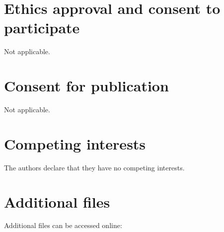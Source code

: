 \section*{Ethics approval and consent to participate}
Not applicable.

\section*{Consent for publication}
Not applicable.

\section*{Competing interests}
The authors declare that they have no competing interests.

\section{Additional files}\label{Additional files}
Additional files can be accessed online: \\



